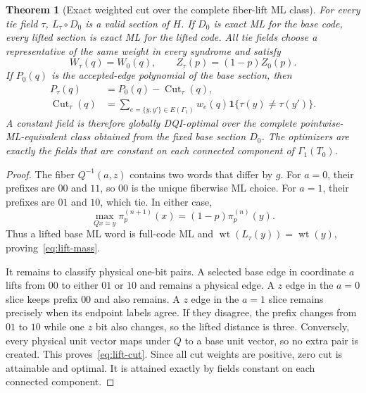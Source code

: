 \documentclass[journal]{IEEEtran}
\newtheorem{theorem}{Theorem}
\theoremstyle{definition}
\theoremstyle{remark}
\newcommand{\ind}{\mathbf 1}
\newcommand{\wt}{\operatorname{wt}}
\newcommand{\Cut}{\operatorname{Cut}}
\begin{document}
\begin{theorem}[Exact weighted cut over the complete fiber-lift ML class]
\label{thm:weighted-cut}
For every tie field $\tau$, $L_\tau\circ D_0$ is a valid section of $H$.  If
$D_0$ is exact ML for the base code, every lifted section is exact ML for the
lifted code.  All tie fields choose a representative of the same weight in
every syndrome and satisfy
\begin{equation}
 W_\tau(q)=W_0(q),\qquad
 Z_\tau(p)=(1-p)Z_0(p).
 \label{eq:lift-mass}
\end{equation}
If $P_0(q)$ is the accepted-edge polynomial of the base section, then
\begin{align}
 P_\tau(q)&=P_0(q)-\Cut_\tau(q),
 \label{eq:lift-cut}\\
 \Cut_\tau(q)&=\sum_{e=\{y,y'\}\in E(\Gamma_1)}
 w_e(q)\ind\{\tau(y)\ne\tau(y')\}.
 \label{eq:cut}
\end{align}
A constant field is therefore globally DQI-optimal over the complete
pointwise-ML-equivalent class obtained from the fixed base section $D_0$.
The optimizers are exactly the fields that are constant on each connected
component of $\Gamma_1(T_0)$.
\end{theorem}

\begin{proof}
The fiber $Q^{-1}(a,z)$ contains two words that differ by $g$.  For $a=0$,
their prefixes are $00$ and $11$, so $00$ is the unique fiberwise ML choice.
For $a=1$, their prefixes are $01$ and $10$, which tie.  In either case,
\begin{equation}
 \max_{Qx=y}\pi_p^{(n+1)}(x)=(1-p)\pi_p^{(n)}(y).
 \label{eq:fiber-prob}
\end{equation}
Thus a lifted base ML word is full-code ML and
$\wt(L_\tau(y))=\wt(y)$, proving~\eqref{eq:lift-mass}.

It remains to classify physical one-bit pairs.  A selected base edge in
coordinate $a$ lifts from $00$ to either $01$ or $10$ and remains a physical
edge.  A $z$ edge in the $a=0$ slice keeps prefix $00$ and also remains.  A
$z$ edge in the $a=1$ slice remains precisely when its endpoint labels agree.
If they disagree, the prefix changes from $01$ to $10$ while one $z$ bit also
changes, so the lifted distance is three.  Conversely, every physical unit
vector maps under $Q$ to a base unit vector, so no extra pair is created.
This proves~\eqref{eq:lift-cut}.  Since all cut weights are positive, zero cut
is attainable and optimal.  It is attained exactly by fields constant on each
connected component.
\end{proof}
\end{document}
